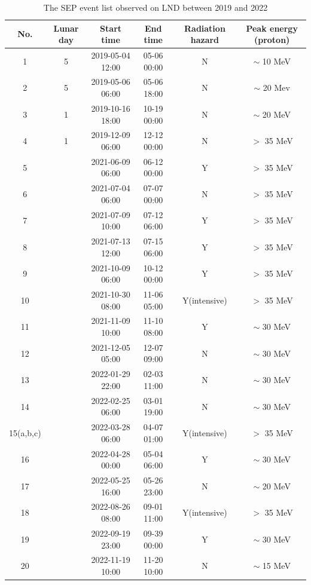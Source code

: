 \begin{table}[!h]
    \centering
    \caption[The SEP event list observed on LND]{The SEP event list observed on LND between 2019 and 2022}
\begin{tabular}{cccccc}
    \hline
    No.     & Lunar day & Start time    & End time      & Radiation hazard  & Peak energy (proton)\\
    \hline
    1       & 5         &  2019-05-04 12:00 & 05-06 00:00               & N  & $\sim$ 10 MeV\\
    2       & 5         &  2019-05-06 06:00 & 05-06 18:00              & N  & $\sim$ 20 Mev \\
    3       & 1         &  2019-10-16 18:00 & 10-19 00:00             & N  & $\sim$ 20 MeV\\
    4       & 1         &  2019-12-09 06:00 & 12-12 00:00             & N  & $>$ 35 MeV\\    
    5       &           &  2021-06-09 06:00 & 06-12 00:00             & Y  & $>$ 35 MeV\\
    6       &           &  2021-07-04 06:00 & 07-07 00:00             & N  & $>$ 35 MeV\\
    7       &           &  2021-07-09 10:00 & 07-12 06:00             & Y  & $>$ 35 MeV\\
    8       &           &  2021-07-13 12:00 & 07-15 06:00             & Y  & $>$ 35 MeV\\
    9       &           &  2021-10-09 06:00 & 10-12 00:00             & Y  & $>$ 35 MeV\\
    10      &           &  2021-10-30 08:00 & 11-06 05:00             & Y(intensive)  & $>$ 35 MeV\\
    11      &           &  2021-11-09 10:00 & 11-10 08:00             & Y  & $\sim$ 30 MeV\\
    12      &           &  2021-12-05 05:00 & 12-07 09:00             & N  & $\sim$ 30 MeV\\
    13      &           &  2022-01-29 22:00 & 02-03 11:00             & N  & $\sim$ 30 MeV\\
    14      &           &  2022-02-25 06:00 & 03-01 19:00             & N  & $\sim$ 30 MeV\\
    15(a,b,c)      &           &  2022-03-28 06:00 & 04-07 01:00             & Y(intensive)  & $>$ 35 MeV\\
    16     &           &  2022-04-28 00:00 & 05-04 06:00             & Y  & $\sim$ 30 MeV\\
    17      &           &  2022-05-25 16:00 & 05-26 23:00             & N  & $\sim$ 20 MeV\\
    18      &           &  2022-08-26 08:00 & 09-01 11:00             & Y(intensive)  & $>$ 35 MeV\\
    19      &           &  2022-09-19 23:00 & 09-39 00:00             & Y  & $\sim$ 30 MeV\\
    20      &           &  2022-11-19 10:00 & 11-20 10:00             & N  & $\sim$ 15 MeV\\
    \hline
\end{tabular}
\label{Tab:appendix_LND_SEP_list}
\end{table}

